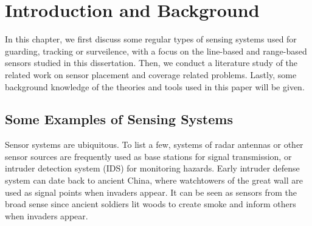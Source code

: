 
\chapter{Introduction and Background} 
\thispagestyle{myheadings} 
In this chapter, we first discuss some regular types of sensing systems 
used for guarding, tracking or surveilence, 
with a focus on the line-based and range-based sensors studied in this dissertation. 
Then, we conduct a literature study of the related work on sensor placement and 
coverage related problems. 
Lastly, some background knowledge of the theories and tools used in this paper will be given. 
\section{Some Examples of Sensing Systems} 
Sensor systems are ubiquitous. To list a few, systems of radar antennas 
or other sensor sources are frequently used as base stations for signal transmission, 
or intruder detection system (IDS) for monitoring hazards. 
Early intruder defense system can date back to ancient China, where 
watchtowers of the great wall are used as signal points when invaders appear. 
It can be seen as sensors from the broad sense 
since ancient soldiers lit woods to create smoke and inform others when invaders appear. 

